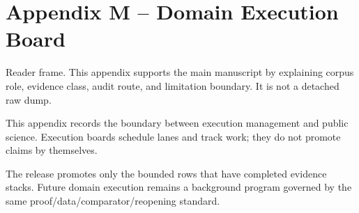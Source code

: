 \section{Appendix M -- Domain Execution Board}
Reader frame. This appendix supports the main manuscript by explaining corpus role, evidence class, audit route, and limitation boundary. It is not a detached raw dump.


\label{sec:oc-core-1-3-domain-execution-board-summary}

This appendix records the boundary between execution management and public science. Execution boards schedule lanes and track work; they do not promote claims by themselves.


The release promotes only the bounded rows that have completed evidence stacks. Future domain execution remains a background program governed by the same proof/data/comparator/reopening standard.
